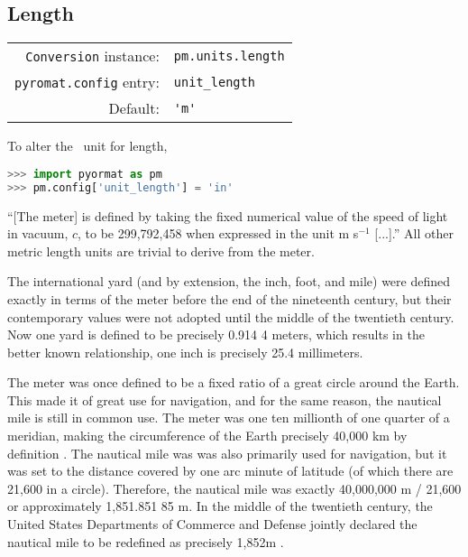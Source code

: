 %
%

\subsection{Length}\label{sec:units:length}

\begin{tabular}{rl}
\hline
\verb|Conversion| instance: & \verb|pm.units.length|\\
\verb|pyromat.config| entry: & \verb|unit_length|\\
Default: & \verb|'m'|\\
\hline
\end{tabular}
\vspace{1em}

To alter the \PM\ unit for length,
\begin{lstlisting}[language=Python]
>>> import pyormat as pm
>>> pm.config['unit_length'] = 'in'
\end{lstlisting}

``[The meter] is defined by taking the fixed numerical value of the speed of light in vacuum, $c$, to be 299,792,458 when expressed in the unit m s$^{-1}$ [...].''\cite[p.131]{si:2019} All other metric length units are trivial to derive from the meter.

The international yard (and by extension, the inch, foot, and mile) were defined exactly in terms of the meter before the end of the nineteenth century, but their contemporary values were not adopted until the middle of the twentieth century.\cite{nbs:sp447}  Now one yard is defined to be precisely 0.914 4 meters, which results in the better known relationship, one inch is precisely 25.4 millimeters.

The meter was once defined to be a fixed ratio of a great circle around the Earth.  This made it of great use for navigation, and for the same reason, the nautical mile is still in common use.  The meter was one ten millionth of one quarter of a meridian, making the circumference of the Earth precisely 40,000 km by definition \cite{nbs:sp447}.  The nautical mile was was also primarily used for navigation, but it was set to the distance covered by one arc minute of latitude (of which there are 21,600 in a circle).  Therefore, the nautical mile was exactly 40,000,000 m / 21,600 or approximately 1,851.851 85 m.  In the middle of the twentieth century, the United States Departments of Commerce and Defense jointly declared the nautical mile to be redefined as precisely 1,852m \cite{nbs:1959}.

